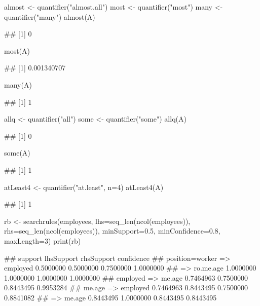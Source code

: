 \documentclass{article}\usepackage[]{graphicx}\usepackage[]{color}
\begin{document}
\begin{Schunk}
% --begin: "quant5"
\begin{Sinput}
almost <- quantifier("almost.all")
most <- quantifier("most")
many <- quantifier("many")
almost(A)
\end{Sinput}
\begin{Soutput}
## [1] 0
\end{Soutput}
\begin{Sinput}
most(A)
\end{Sinput}
\begin{Soutput}
## [1] 0.001340707
\end{Soutput}
\begin{Sinput}
many(A)
\end{Sinput}
\begin{Soutput}
## [1] 1
\end{Soutput}
%
% --end: "quant5"
\end{Schunk}

\begin{Schunk}
% --begin: "quant6"
\begin{Sinput}
allq <- quantifier("all")
some <- quantifier("some")
allq(A)
\end{Sinput}
\begin{Soutput}
## [1] 0
\end{Soutput}
\begin{Sinput}
some(A)
\end{Sinput}
\begin{Soutput}
## [1] 1
\end{Soutput}
%
% --end: "quant6"
\end{Schunk}

\begin{Schunk}
% --begin: "quant7"
\begin{Sinput}
atLeast4 <- quantifier("at.least", n=4)
atLeast4(A)
\end{Sinput}
\begin{Soutput}
## [1] 1
\end{Soutput}
%
% --end: "quant7"
\end{Schunk}

\begin{Schunk}
% --begin: "searchrules"
\begin{Sinput}
rb <- searchrules(employees,
                  lhs=seq_len(ncol(employees)),
                  rhs=seq_len(ncol(employees)),
                  minSupport=0.5,
                  minConfidence=0.8,
                  maxLength=3)
print(rb)
\end{Sinput}
\begin{Soutput}
##                               support lhsSupport rhsSupport confidence
## position=worker => employed 0.5000000  0.5000000  0.7500000  1.0000000
##  => ro.me.age               1.0000000  1.0000000  1.0000000  1.0000000
## employed => me.age          0.7464963  0.7500000  0.8443495  0.9953284
## me.age => employed          0.7464963  0.8443495  0.7500000  0.8841082
##  => me.age                  0.8443495  1.0000000  0.8443495  0.8443495
\end{Soutput}
%
% --end: "searchrules"
\end{Schunk}
\end{document}
